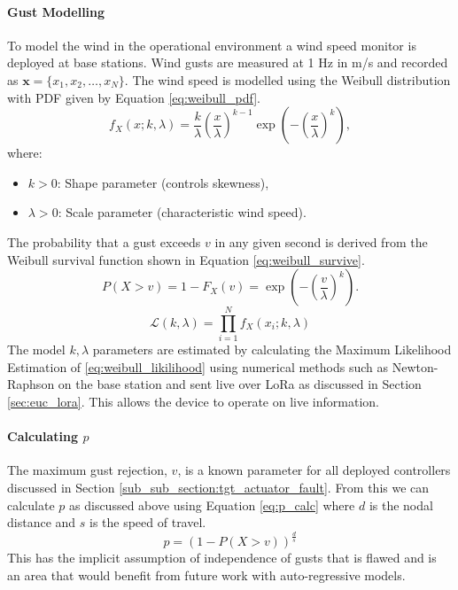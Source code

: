\paragraph{Gust Modelling}
To model the wind in the operational environment a wind speed monitor is deployed at base stations. Wind gusts are measured at 1 Hz in m/s and recorded as $\mathbf{x} =  \{x_1, x_2, \dots, x_N\}$. The wind speed is modelled using the Weibull distribution \cite{weibull1951} with PDF given by Equation \ref{eq:weibull_pdf}.
\begin{equation}\label{eq:weibull_pdf}
    f_X(x; k, \lambda) = \frac{k}{\lambda} \left(\frac{x}{\lambda}\right)^{k-1} \exp\left(-\left(\frac{x}{\lambda}\right)^k\right),
\end{equation}
where:
\begin{itemize}
    \item \( k > 0 \): Shape parameter (controls skewness),
    \item \( \lambda > 0 \): Scale parameter (characteristic wind speed).
\end{itemize}
The probability that a gust exceeds \( v \) in any given second is derived from the Weibull survival function shown in Equation \ref{eq:weibull_survive}.
\begin{equation}\label{eq:weibull_survive}
    P(X > v) = 1 - F_X(v) = \exp\left(-\left(\frac{v}{\lambda}\right)^k\right).
\end{equation}
\begin{equation}\label{eq:weibull_likilihood}
     \mathcal{L}(k, \lambda) = \prod_{i=1}^N f_X(x_i; k, \lambda)
\end{equation}
The model $k, \lambda$ parameters are estimated by calculating the Maximum Likelihood Estimation of \ref{eq:weibull_likilihood} using numerical methods such as Newton-Raphson \cite{rinne2008} on the base station and sent live over LoRa as discussed in Section \ref{sec:euc_lora}. This allows the device to operate on live information.

\paragraph{Calculating $p$}
The maximum gust rejection, $v$, is a known parameter for all deployed controllers discussed in Section \ref{sub_sub_section:tgt_actuator_fault}. From this we can calculate $p$ as discussed above using Equation \ref{eq:p_calc} where $d$ is the nodal distance and $s$ is the speed of travel.
\begin{equation}\label{eq:p_calc}
    p = (1-P(X>v))^{\frac{d}{s}}
\end{equation}
This has the implicit assumption of independence of gusts that is flawed and is an area that would benefit from future work with auto-regressive models.

